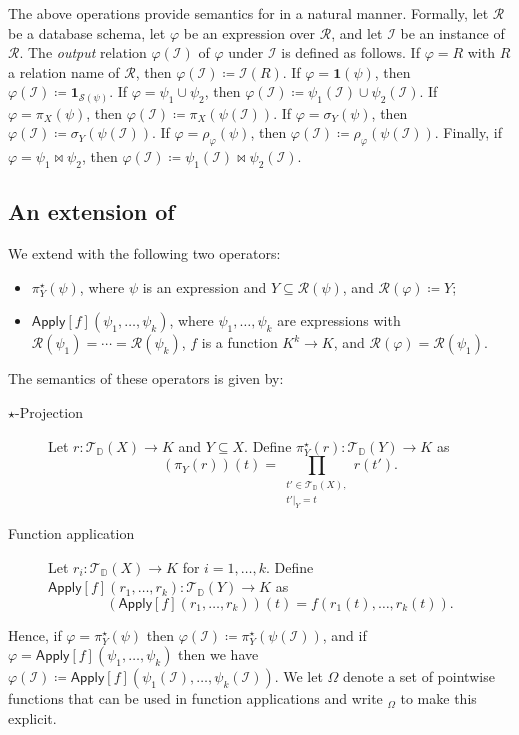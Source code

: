 The above operations provide semantics for \ARA in a natural manner. Formally, let $\mathcal{R}$ be a database schema, let $\varphi$ be an \ARA expression over $\mathcal{R}$, and let $\mathcal{I}$ be an instance of $\mathcal{R}$. The \emph{output} relation $\varphi(\mathcal{I})$ of $\varphi$ under $\mathcal{I}$ is defined as follows. If $\varphi = R$ with $R$ a relation name of $\mathcal{R}$, then $\varphi(\mathcal{I}) \coloneqq  \mathcal{I}(R)$. If $\varphi = \mathbf{1}(\psi)$, then $\varphi(\mathcal{I}) \coloneqq  \mathbf{1}_{\mathcal{S}(\psi)}$. If $\varphi = \psi_1 \cup \psi_2$, then $\varphi(\mathcal{I}) \coloneqq  \psi_1(\mathcal{I}) \cup \psi_2(\mathcal{I})$. If $\varphi = \pi_{X}(\psi)$, then $\varphi(\mathcal{I}) \coloneqq  \pi_{X}(\psi(\mathcal{I}))$. If $\varphi = \sigma_{Y}(\psi)$, then $\varphi(\mathcal{I}) \coloneqq  \sigma_{Y}(\psi(\mathcal{I}))$. If $\varphi = \rho_\varphi(\psi)$, then $\varphi(\mathcal{I}) \coloneqq  \rho_\varphi(\psi(\mathcal{I}))$. Finally, if $\varphi = \psi_1 \Join \psi_2$, then $\varphi(\mathcal{I}) \coloneqq  \psi_1(\mathcal{I}) \Join \psi_2(\mathcal{I})$.


\subsection{An extension of \ARA}
We extend \ARA with the following two operators:
\begin{itemize}
 \item $\pi_Y^\star(\psi)$, where $\psi$ is an \ARA expression and $Y \subseteq \mathcal{R}(\psi)$, and $\mathcal{R}(\varphi) \coloneqq  Y$;
 \item $\textsf{Apply}[f](\psi_1,\ldots,\psi_k)$, where $\psi_1,\ldots,\psi_k$ are \ARA expressions with $\mathcal{R}(\psi_1)=\cdots=\mathcal{R}(\psi_k)$, 
 $f$ is a function $K^k\to K$,
 and 
 $\mathcal{R}(\varphi)=\mathcal{R}(\psi_1)$.
\end{itemize}
The semantics of these operators is given by:
\begin{description}
\item[$\star$-Projection] Let $r: \mathcal{T}_{\mathbb{D}}(X) \to K$ and $Y \subseteq X$. Define $\pi_{Y}^\star(r): \mathcal{T}_{\mathbb{D}}(Y) \to K$ as
\[
(\pi_{Y}(r))(t) = \prod_{\substack{t' \in \mathcal{T}_{\mathbb{D}}(X),\\ t'|_{Y} = t}} \!\! r(t').
\]
\item[Function application] Let $r_{i}: \mathcal{T}_{\mathbb{D}}(X) \to K$ for $i=1,\ldots,k$. Define $\textsf{Apply}[f](r_1,\ldots,r_k): \mathcal{T}_{\mathbb{D}}(Y) \to K$ as
\[
(\textsf{Apply}[f](r_1,\ldots,r_k))(t) = f(r_1(t),\ldots,r_k(t)).
\]
\end{description}
Hence, if $\varphi=\pi^\star_{Y}(\psi)$ then 
$\varphi(\mathcal{I})\coloneqq \pi^\star_{Y}(\psi(\mathcal{I}))$, and
if $\varphi=\textsf{Apply}[f](\psi_1,\allowbreak \ldots,\psi_k)$ then we have
$\varphi(\mathcal{I})\coloneqq \textsf{Apply}[f](\psi_1(\mathcal{I}), \ldots,\psi_k(\mathcal{I}))$. We let $\Omega$ denote a set of pointwise functions that can be used in function applications and write \ARA$_\Omega$ to make this explicit.


